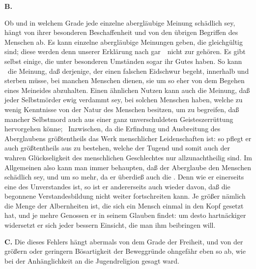 \vabst \textbf{B.} \par
Ob und in welchem Grade jede einzelne abergläubige Meinung schädlich sey, hängt von ihrer besonderen Beschaffenheit und von den übrigen Begriffen des Menschen ab. Es kann einzelne abergläubige Meinungen geben, die gleichgültig sind; diese werden denn unserer Erklärung nach gar~\ nicht zur  gehören. Es gibt selbst einige, die unter besonderen Umständen sogar ihr Gutes haben. So kann \zB\ die Meinung, daß derjenige, der einen falschen Eidschwur begeht, innerhalb  und  sterben müsse, bei manchen Menschen dienen, sie um so eher von dem Begehen eines Meineides abzuhalten. Einen ähnlichen Nutzen kann auch die Meinung, daß jeder Selbstmörder ewig verdammt sey, bei solchen Menschen haben, welche zu wenig Kenntnisse von der Natur des Menschen besitzen, um zu begreifen, daß mancher Selbstmord auch aus einer ganz unverschuldeten Geisteszerrüttung hervorgehen könne; \udgl\ Inzwischen, da die Erfindung und Ausbreitung des Aberglaubens größtentheils das Werk menschlicher Leidenschaften ist: so pflegt er auch größtentheils aus  zu bestehen, welche der Tugend und somit auch der wahren Glückseligkeit des menschlichen Geschlechtes nur allzunachtheilig sind. Im Allgemeinen also kann man immer behaupten, daß der Aberglaube den Menschen schädlich sey, und um so mehr, da er überdieß auch die . Denn wie er einerseits eine  des Unverstandes ist, so ist er andererseits auch wieder  davon, daß die begonnene Verstandesbildung nicht weiter fortschreiten kann. Je größer nämlich die Menge der Albernheiten ist, die sich ein Mensch einmal in den Kopf gesetzt hat, und je mehre Genossen er in seinem Glauben findet: um desto hartnäckiger widersetzt er sich jeder bessern Einsicht, die man ihm beibringen will.\par
\vabst \textbf{C.} Die  dieses Fehlers hängt abermals von dem Grade der Freiheit, und von der größern oder geringern Bösartigkeit der Beweggründe ohngefähr eben so ab, wie bei der Anhänglichkeit an die Jugendreligion gesagt ward.

